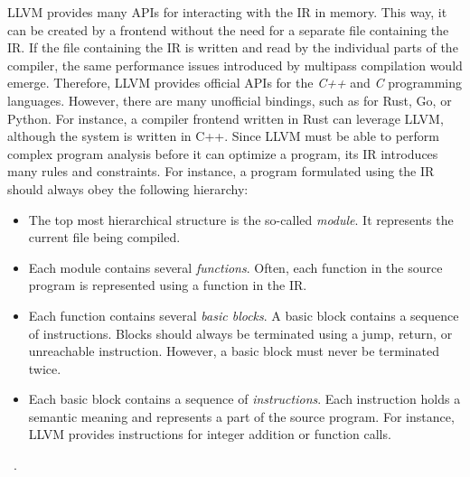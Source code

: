 LLVM provides many APIs for interacting with the IR in memory.
This way, it can be created by a frontend without the need for a separate file containing the IR.
If the file containing the IR is written and read by the individual parts of the compiler,
the same performance issues introduced by multipass compilation would emerge.
Therefore, LLVM provides official APIs for the \emph{C++} and \emph{C} programming languages.
However, there are many unofficial bindings, such as for Rust, Go, or Python.
For instance, a compiler frontend written in Rust can leverage LLVM, although the system is written in C++.
Since LLVM must be able to perform complex program analysis before it can optimize a program,
its IR introduces many rules and constraints.
For instance, a program formulated using the IR should always obey the following hierarchy:

\begin{itemize}
	\item The top most hierarchical structure is the so-called \emph{module}.
	      It represents the current file being compiled.
	\item Each module contains several \emph{functions}.
	      Often, each function in the source program is represented using a function in the IR\@.
	\item Each function contains several \emph{basic blocks}.
	      A basic block contains a sequence of instructions.
	      Blocks should always be terminated using a jump, return, or unreachable instruction.
	      However, a basic block must never be terminated twice.
	\item Each basic block contains a sequence of \emph{instructions}.
	      Each instruction holds a semantic meaning and represents a part of the source program.
	      For instance, LLVM provides instructions for integer addition or function calls.
\end{itemize}~\cite[p.~211-213]{Hsu2021-ez}.

